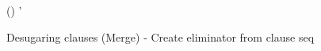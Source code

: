 \begin{figure}[H]
\flushleft{}
\begin{smathpar}
{
   () \cdot {}
   \dfwdarrow
   \sigma \join \sigma'
}
\end{smathpar}
\caption{Desugaring clauses (Merge) - Create eliminator from clause seq}
\end{figure}